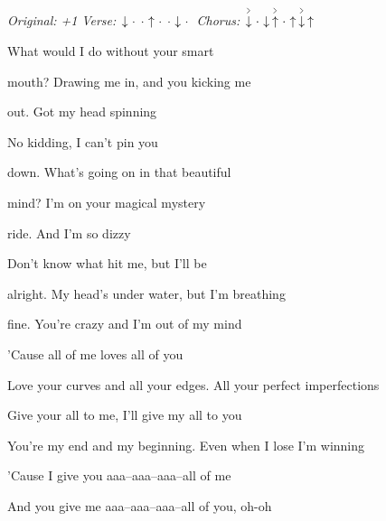 \begin{song}


\begin{headerbox}
\RaiseBoxWithAccents
\textit{Original: +1} \quad
\textit{Verse:} $\Down\Miss\Miss\Up\Miss\Miss\Down\Miss$ \quad
\textit{Chorus:} $\AccentDown\Miss\Down\AccentUp\Miss\Up\AccentDown\Up$
\end{headerbox}

\begin{hchordbox}
\end{hchordbox}

\large

\bigskip

\Intro {}     \par

\bigskip

 What would I do without your smart \par
{}mouth? Drawing me in, and you kicking me \par
{}out. Got my head spinning \par
{}No kidding, I can't pin you \par
{}down. What's going on in that beautiful \par
{}mind? I'm on your magical mystery \par
{}ride. And I'm so dizzy \par
Don't know what hit me, but I'll be \par

\bigskip

alright. My head's under water, but I'm breathing \par
{}fine. You're crazy and I'm out of my mind \par

\bigskip

'Cause all of me loves all of you \par
Love your curves and all your edges. All your perfect imperfections \par
Give your all to me, I'll give my all to you \par
You're my end and my beginning. Even when I lose I'm winning \par
'Cause I give you aaa–aaa–aaa–all of me   \par
And you give me aaa–aaa–aaa–all of you, oh-oh \par


\end{song}
